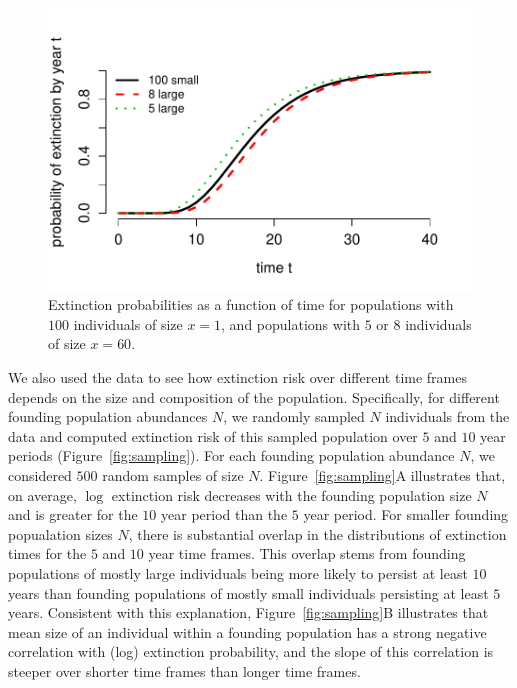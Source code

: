 \documentclass[12pt]{amsart}\usepackage[]{graphicx}\usepackage[]{color}
\makeatletter
\def\maxwidth{ %
  \ifdim\Gin@nat@width>\linewidth
    \linewidth
  \else
    \Gin@nat@width
  \fi
}
\newenvironment{knitrout}{}{} %
\makeatother
\begin{document}
\begin{knitrout}
\color{fgcolor}\begin{figure}
\includegraphics[width=\maxwidth]{figure/compare-1} \caption[Extinction probabilities as a function of time for populations with ]{Extinction probabilities as a function of time for populations with $100$ individuals of size $x=1$, and populations with $5$ or $8$ individuals of size $x=60$.}\label{fig:compare}
\end{figure}


\end{knitrout}

We also used the data to see how extinction risk over different time frames depends on the size and composition of the population. Specifically, for different founding population abundances $N$, we randomly sampled $N$ individuals from the data and computed extinction risk of this sampled population over $5$ and $10$ year periods (Figure~\ref{fig:sampling}). For each founding population abundance $N$, we considered $500$ random samples of size $N$. Figure~\ref{fig:sampling}A illustrates that, on average, $\log$ extinction risk decreases with the founding population size $N$ and is greater for the $10$ year period than the $5$ year period. For smaller founding popualation sizes $N$, there is substantial overlap in the distributions of extinction times for the $5$ and $10$ year time frames. This overlap stems from founding populations of mostly large individuals being more likely to persist at least $10$ years than founding populations of mostly small individuals persisting at least $5$ years. Consistent with this explanation, Figure~\ref{fig:sampling}B illustrates that mean size of an individual within a founding  population has a strong negative correlation with (log) extinction probability, and the slope of this correlation is steeper over shorter time frames than longer time frames.
\end{document}
